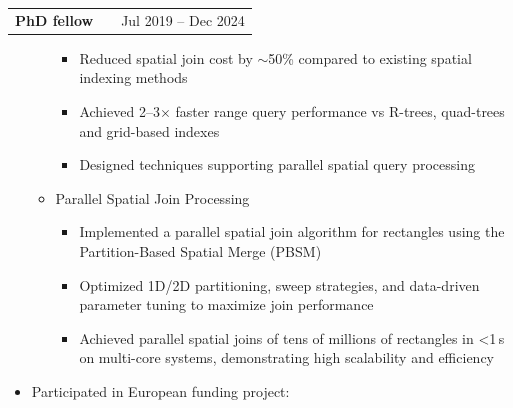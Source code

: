 \documentclass[a4paper,10pt]{article}
\makeatletter
\newenvironment{job}[2]
{
	\begin{tabularx}{\linewidth}{@{}l X r@{}}
		\small
		\textbf{#1} & \hfill &  #2 \\[3.75pt]
	\end{tabularx}
	\footnotesize
	\setlength{\parskip}{3pt} %
	\setlength{\parindent}{0pt} %
}
{
}
\makeatother
\begin{document}
\begin{job}{PhD fellow}{Jul 2019 – Dec 2024}
\begin{itemize}
\begin{itemize}
\begin{itemize}
				\item Reduced spatial join cost by $\sim$50\% compared to existing spatial indexing methods
				
				\item Achieved 2–3$\times$ faster range query performance vs R-trees, quad-trees and grid-based indexes
				
				\item Designed techniques supporting parallel spatial query processing
			\end{itemize}
			
			
		\item Parallel Spatial Join Processing
			\begin{itemize}
				\item Implemented a parallel spatial join algorithm for rectangles using the Partition-Based Spatial Merge (PBSM)
				
				\item Optimized 1D/2D partitioning, sweep strategies, and data-driven parameter tuning to maximize join performance
				
				\item Achieved parallel spatial joins of tens of millions of rectangles in <1 s on multi-core systems, demonstrating high scalability and efficiency

				
			\end{itemize}
	
			
	
		
		
	\end{itemize}
		
		\vspace{-1\baselineskip}
		
		\item Participated in European funding project:
		\begin{itemize}
		

\end{itemize}
\end{itemize}
\end{job}
\end{document}
